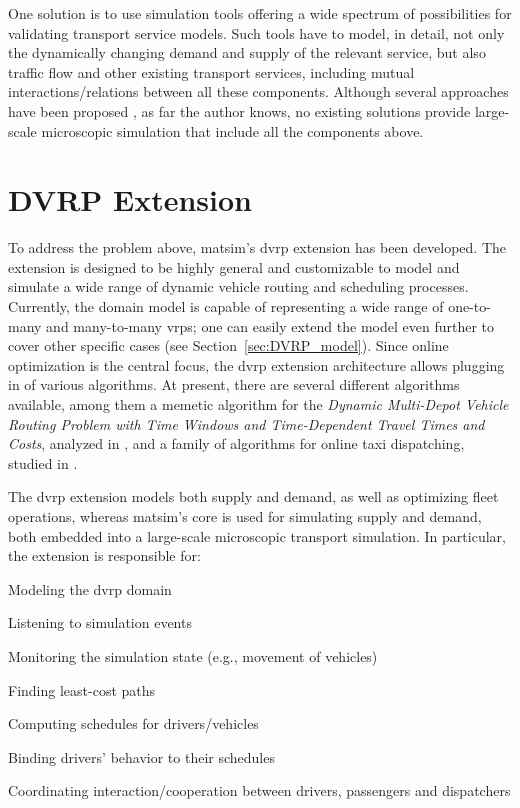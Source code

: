 One solution is to use simulation tools offering a wide spectrum of possibilities for validating transport service models. Such tools have to model, in detail, not only the dynamically changing demand and supply of the relevant service, but also traffic flow and other existing transport services, including mutual interactions/relations between all these components. Although several approaches have been proposed \citep[e.g.,][]{ReganMahmassaniJaillet1998DynamicFleetManagementSimulation, BarceloEtc2007RoutingSchedulingSimulationLogistics, LiaoEtc2008ObjOrFramework4DVRP,Certicky:2014:AST:2615731.2616118}, as far the author knows, no existing solutions provide large-scale microscopic simulation that include all the components above.

\section{DVRP Extension}
To address the problem above, \gls{matsim}'s \gls{dvrp} \gls{extension} has been developed. The \gls{extension} is designed to be highly general and customizable to model and simulate a wide range of dynamic vehicle routing and scheduling processes. Currently, the domain model is capable of representing a wide range of one-to-many and many-to-many \glspl{vrp}; one can easily extend the model even further to cover other specific cases (see Section~\ref{sec:DVRP_model}). Since online optimization is the central focus, the \gls{dvrp} extension architecture allows plugging in of various algorithms. At present, there are several different algorithms available, among them a memetic  algorithm for the \emph{Dynamic Multi-Depot Vehicle Routing Problem with Time Windows and Time-Dependent Travel Times and Costs}, analyzed in \citep{MaciejewskiNagel2012DVRPMatsimPPAM}, and a family of algorithms for online taxi dispatching, studied in \citep{ MaciejewskiNagelOnlineTaxis2, MaciejewskiNagel2013OnlineTaxisVSPWP, MaciejewskiNagel2013CooperationPPAM, Maciejewski2014OnlineViaOffline}.

The \gls{dvrp} extension models both supply and demand, as well as optimizing fleet operations, whereas \gls{matsim}'s core is used for simulating supply and demand, both embedded into a large-scale microscopic transport simulation. In particular, the extension is responsible for:
%
\begin{compactitem}
	\item Modeling the \gls{dvrp} domain
	\item Listening to simulation events
	\item Monitoring the simulation state (e.g., movement of vehicles)
	\item Finding least-cost paths
	\item Computing schedules for drivers/vehicles
	\item Binding drivers' behavior to their schedules
	\item Coordinating interaction/cooperation between drivers, passengers and dispatchers
\end{compactitem}

